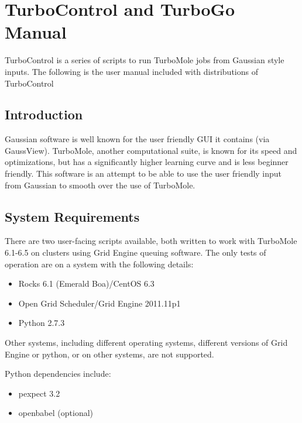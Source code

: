 \chapter{TurboControl and TurboGo Manual}\label{chap.readme}


TurboControl is a series of scripts to run TurboMole jobs from Gaussian style inputs. The following is the user manual included with distributions of TurboControl 

\section{Introduction}
Gaussian software is well known for the user friendly GUI it contains (via GaussView). TurboMole, another computational suite, is known for its speed and optimizations, but has a significantly higher learning curve and is less beginner friendly. This software is an attempt to be able to use the user friendly input from Gaussian to smooth over the use of TurboMole.

\section{System Requirements}

There are two user-facing scripts available, both written to work with TurboMole 6.1-6.5 on clusters using Grid Engine queuing software. The only tests of operation are on a system with the following details:

\begin{itemize}
\itemsep1pt\parskip0pt
\item
  Rocks 6.1 (Emerald Boa)/CentOS 6.3
\item
  Open Grid Scheduler/Grid Engine 2011.11p1
\item
  Python 2.7.3
\end{itemize}

Other systems, including different operating systems, different versions of Grid Engine or python, or on other systems, are not supported.

Python dependencies include:

\begin{itemize}
\itemsep1pt\parskip0pt
\item
  pexpect 3.2\autocite{pexpect}
\item
  openbabel (optional)\autocite{openbabel, oboyle2011} 
\end{itemize}

